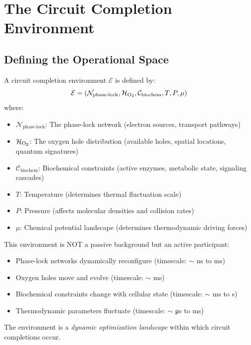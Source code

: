 \section{The Circuit Completion Environment}

\subsection{Defining the Operational Space}

\begin{definition}
\label{def:completion_environment}
A circuit completion environment $\mathcal{E}$ is defined by:
\begin{equation}
\mathcal{E} = (\mathcal{N}_{\text{phase-lock}}, \mathcal{H}_{\ce{O2}}, \mathcal{C}_{\text{biochem}}, T, P, \mu)
\end{equation}
where:
\begin{itemize}
\item $\mathcal{N}_{\text{phase-lock}}$: The phase-lock network (electron sources, transport pathways)
\item $\mathcal{H}_{\ce{O2}}$: The oxygen hole distribution (available holes, spatial locations, quantum signatures)
\item $\mathcal{C}_{\text{biochem}}$: Biochemical constraints (active enzymes, metabolic state, signaling cascades)
\item $T$: Temperature (determines thermal fluctuation scale)
\item $P$: Pressure (affects molecular densities and collision rates)
\item $\mu$: Chemical potential landscape (determines thermodynamic driving forces)
\end{itemize}
\end{definition}

\begin{remark}
This environment is NOT a passive background but an active participant:
\begin{itemize}
\item Phase-lock networks dynamically reconfigure (timescale: $\sim$ ns to ms)
\item Oxygen holes move and evolve (timescale: $\sim$ ms)
\item Biochemical constraints change with cellular state (timescale: $\sim$ ms to s)
\item Thermodynamic parameters fluctuate (timescale: $\sim$ μs to ms)
\end{itemize}

The environment is a \textit{dynamic optimization landscape} within which circuit completions occur.
\end{remark}

